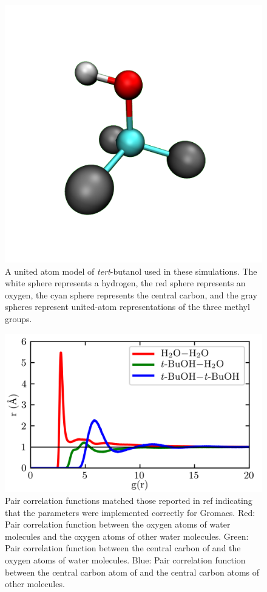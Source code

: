 \begin{figure}
    \center
    \includegraphics[width=\single]{figures-helix/tba.png}
    \caption{
        A united atom model of \emph{tert}-butanol used in these simulations. 
        The white sphere represents a hydrogen, the red sphere represents an oxygen, the cyan sphere represents the central carbon, and the gray spheres represent united-atom representations of the three methyl groups.
    }
    \label{fig:helix-tba}
\end{figure}

\begin{figure}
    \center
    \includegraphics[width=\single]{figures-helix/rdfs.png}
    \caption{
        Pair correlation functions matched those reported in ref  indicating that the \tba{} parameters were implemented correctly for Gromacs. 
        Red: Pair correlation function between the oxygen atoms of water molecules and the oxygen atoms of other water molecules. 
        Green: Pair correlation function between the central carbon of \tba{} and the oxygen atoms of water molecules. 
        Blue: Pair correlation function between the central carbon atom of \tba{} and the central carbon atoms of other \tba{} molecules. 
    }
    \label{fig:helix-rdfs}
\end{figure}

